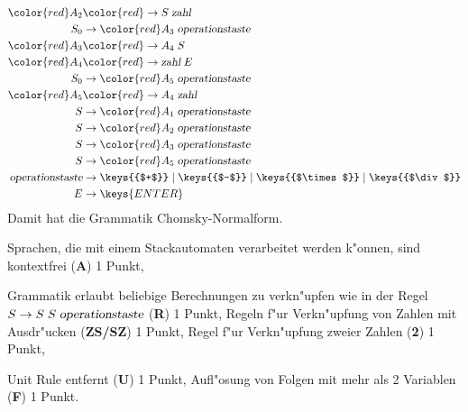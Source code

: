 \begin{loesung}
\begin{teilaufgaben}
\begin{align*}
\color{red}A_2&\color{red}\rightarrow S \; \textsl{zahl}
\\
S_0&\rightarrow {\color{red}A_3} \; \textsl{operationstaste}
\\
\color{red}A_3&\color{red}\rightarrow A_4 \; S
\\
\color{red}A_4&\color{red}\rightarrow \textsl{zahl} \; E
\\
S_0&\rightarrow {\color{red}A_5} \; \textsl{operationstaste}
\\
\color{red}A_5&\color{red}\rightarrow A_4 \; \textsl{zahl}
\\
S&\rightarrow {\color{red}A_1} \; \textsl{operationstaste}
\\
S&\rightarrow {\color{red}A_2} \; \textsl{operationstaste}
\\
S&\rightarrow {\color{red}A_3} \;\textsl{operationstaste}
\\
S&\rightarrow {\color{red}A_5} \; \textsl{operationstaste}
\\
\textsl{operationstaste}&\rightarrow
\keys{{$+$}}
\;|\;
\keys{{$-$}}
\;|\;
\keys{{$\times$}}
\;|\;
\keys{{$\div$}}
\\
E&\rightarrow\keys{ENTER}
\end{align*}
Damit hat die Grammatik Chomsky-Normalform.
\end{teilaufgaben}
\end{loesung}

\begin{bewertung}
\begin{teilaufgaben}
\item
Sprachen, die mit einem Stackautomaten verarbeitet werden k"onnen, sind
kontextfrei ({\bf A}) 1 Punkt,
\item
Grammatik erlaubt beliebige Berechnungen zu verkn"upfen wie in der
Regel $S\to S\;S\;\textsl{operationstaste}$ ({\bf R}) 1 Punkt,
Regeln f"ur Verkn"upfung von Zahlen mit Ausdr"ucken ({\bf ZS/SZ}) 1 Punkt,
Regel f"ur Verkn"upfung zweier Zahlen ({\bf 2}) 1 Punkt,
\item
Unit Rule entfernt ({\bf U}) 1 Punkt, Aufl"osung von Folgen mit mehr
als 2 Variablen ({\bf F}) 1 Punkt.
\end{teilaufgaben}
\end{bewertung}

